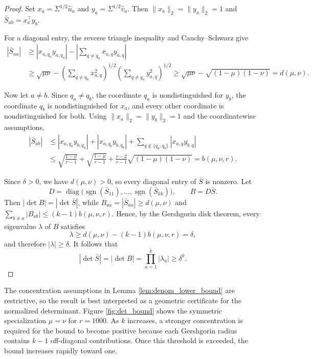 \documentclass[11pt, preprint]{article}
\begin{document}
\begin{proof}
Set $x_a=\Sigma^{1/2}\widehat u_a$ and
$y_a=\Sigma^{1/2}\widehat v_a$. Then
$\|x_a\|_2=\|y_a\|_2=1$ and
$\bar S_{ab}=x_a^\top y_b$.

For a diagonal entry, the reverse triangle inequality and
Cauchy--Schwarz give
\[
\begin{aligned}
|\bar S_{aa}|
&\geq
|x_{a,q_a}y_{a,q_a}|
-
\left|
\sum_{q\neq q_a}x_{a,q}y_{a,q}
\right| \\
&\geq
\sqrt{\mu\nu}
-
\left(\sum_{q\neq q_a}x_{a,q}^2\right)^{1/2}
\left(\sum_{q\neq q_a}y_{a,q}^2\right)^{1/2} \geq
\sqrt{\mu\nu}
-
\sqrt{(1-\mu)(1-\nu)}
=
d(\mu,\nu).
\end{aligned}
\]

Now let $a\neq b$. Since $q_a\neq q_b$, the coordinate $q_a$ is
nondistinguished for $y_b$, the coordinate $q_b$ is nondistinguished
for $x_a$, and every other coordinate is nondistinguished for both.
Using $\|x_a\|_2=\|y_b\|_2=1$ and the coordinatewise assumptions,
\[
\begin{aligned}
|\bar S_{ab}|
&\leq
|x_{a,q_a}y_{b,q_a}|
+
|x_{a,q_b}y_{b,q_b}|
+
\sum_{q\notin\{q_a,q_b\}}|x_{a,q}y_{b,q}| \\
&\leq
\sqrt{\frac{1-\nu}{r-1}}
+
\sqrt{\frac{1-\mu}{r-1}}
+
\frac{r-2}{r-1}\sqrt{(1-\mu)(1-\nu)} =
b(\mu,\nu,r).
\end{aligned}
\]

Since $\delta>0$, we have $d(\mu,\nu)>0$, so every diagonal entry of
$\bar S$ is nonzero. Let
\[
D=
\operatorname{diag}
\bigl(
\operatorname{sgn}(\bar S_{11}),\ldots,
\operatorname{sgn}(\bar S_{kk})
\bigr),
\qquad
B=D\bar S.
\]
Then $|\det B|=|\det\bar S|$, while
$B_{aa}=|\bar S_{aa}|\geq d(\mu,\nu)$ and
\(
\sum_{b\neq a}|B_{ab}|
\leq
(k-1)b(\mu,\nu,r).
\)
Hence, by the Gershgorin disk theorem, every eigenvalue $\lambda$ of
$B$ satisfies
\[
\lambda
\geq
d(\mu,\nu)-(k-1)b(\mu,\nu,r)
=
\delta,
\]
and therefore $|\lambda|\geq\delta$. It follows that
\[
|\det\bar S|
=
|\det B|
=
\prod_{a=1}^k|\lambda_a|
\geq
\delta^k.
\]
\end{proof}

The concentration assumptions in Lemma \ref{lem:denom_lower_bound} are
restrictive, so the result is best interpreted as a geometric certificate for
the normalized determinant. Figure \ref{fig:det_bound} shows the symmetric
specialization $\mu=\nu$ for $r=1000$. As $k$ increases, a stronger
concentration is required for the bound to become positive because each
Gershgorin radius contains $k-1$ off-diagonal contributions. Once this
threshold is exceeded, the bound increases rapidly toward one.
\end{document}
